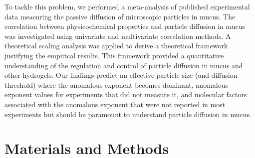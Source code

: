 \documentclass[aps,prl,preprint,superscriptaddress,showkeys,linenumbers]{revtex4-1}
\begin{document}
To tackle this problem, we performed a meta-analysis of published experimental data measuring the passive diffusion of microscopic particles in mucus. The correlation between physicochemical properties and particle diffusion in mucus was investigated using univariate and multivariate correlation methods. A theoretical scaling analysis was applied to derive a theoretical framework justifying the empirical results. This framework provided a quantitative understanding of the regulation and control of particle diffusion in mucus and other hydrogels. \textcolor{Antonio}{Our findings predict an effective particle size (and diffusion threshold) where the anomalous exponent becomes dominant, anomalous exponent values for experiments that did not measure it, and molecular factors associated with the anomalous exponent that were not reported in most experiments but should be paramount to understand particle diffusion in mucus.}


\section*{Materials and Methods}
\end{document}
